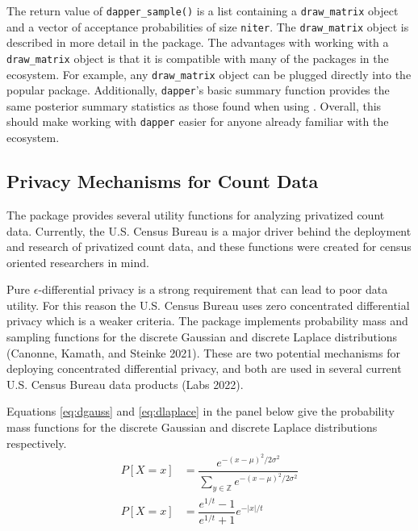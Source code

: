 The return value of \texttt{dapper\_sample()} is a list containing
a \texttt{draw\_matrix} object and a vector of acceptance probabilities of size \texttt{niter}. The \texttt{draw\_matrix} object is described
in more detail in the  package. The advantages with working
with a \texttt{draw\_matrix} object is that it is compatible with many of the packages in
the  ecosystem. For example, any \texttt{draw\_matrix} object can be
plugged directly into the popular  package. Additionally,
\texttt{dapper}'s basic summary function provides the same posterior summary statistics
as those found when using . Overall, this should make working with \texttt{dapper} easier
for anyone already familiar with the  ecosystem.

\hypertarget{privacy-mechanisms-for-count-data}{%
\subsection{Privacy Mechanisms for Count Data}\label{privacy-mechanisms-for-count-data}}

The  package provides several utility functions
for analyzing privatized count data. Currently, the U.S. Census Bureau
is a major driver behind the deployment and research of privatized
count data, and these functions were created for census oriented
researchers in mind.

Pure \(\epsilon\)-differential privacy is a strong requirement
that can lead to poor data utility. For this reason the U.S. Census Bureau uses
zero concentrated differential privacy which is
a weaker criteria. The  package implements probability mass and sampling functions
for the discrete Gaussian and discrete Laplace distributions (Canonne, Kamath, and Steinke 2021). These
are two potential mechanisms for deploying concentrated differential privacy,
and both are used in several current U.S. Census Bureau data products (Labs 2022).

Equations \eqref{eq:dgauss} and \eqref{eq:dlaplace} in the panel below give the
probability mass functions for the discrete Gaussian and discrete Laplace distributions respectively.
\begin{align}
P[X = x] &= \dfrac{e^{-(x - \mu)^2/2\sigma^2}}{\sum_{y \in \mathbb{Z}} e^{-(x-\mu)^2/2\sigma^2}} \label{eq:dgauss}\\
P[X = x] &= \dfrac{e^{1/t} - 1}{e^{1/t} + 1} e^{-|x|/t} \label{eq:dlaplace}
\end{align}

